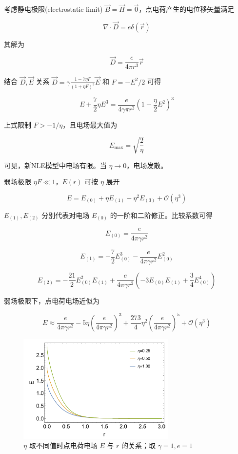 \documentclass[aps,prl,preprint,groupedaddress,showkeys]{revtex4-2}
\begin{document}
考虑静电极限(electrostatic limit) $\vec{B}=\vec{H}=\vec{0} $，点电荷产生的电位移矢量满足

$$
\nabla\cdot\vec{D} = e\delta(\vec{r})
$$

其解为

$$
\vec{D}
=\frac{e }{4\pi r^3 } \vec{r}
$$

结合 $\vec{D},\vec{E} $ 关系 $\vec{D}=\gamma\frac{1-7\eta F }{(1+\eta F)^3 }\vec{E} $ 和 $F=-E^2/2 $ 可得

$$
E+\frac{7 }{2 } \eta E^3
=\frac{e }{4\gamma \pi r^2 } \left(1-\frac{\eta  }{2 } E^2 \right)^3 
$$

上式限制 $F>-1/\eta$，且电场最大值为

$$
E_{\max}=\sqrt{\frac{2 }{\eta } }
$$

可见，新NLE模型中电场有限。当 $\eta\to 0 $，电场发散。

弱场极限 $\eta F\ll 1 $，$E(r) $ 可按 $\eta $ 展开

$$
E
=E_{(0)} + \eta E_{(1)} + \eta^2 E_{(3)} + \mathcal{O}\left(\eta^3 \right)
$$

$E_{(1)},E_{(2)} $ 分别代表对电场 $E_{(0)} $ 的一阶和二阶修正。比较系数可得
    
$$
E_{(0)}
=\frac{e }{4\pi\gamma r^2 }
$$

$$
E_{(1)} 
=-\frac{7 }{2 } E_{(0)}^3 - \frac{e }{4\pi \gamma r^2 } E_{(0)}^2
$$

$$
E_{(2)}
=-\frac{21 }{2 } E_{(0)}^2 E_{(1)} + \frac{e }{4\pi\gamma r^2 } \left(-3E_{(0)}E_{(1)} + \frac{3 }{4 } E_{(0)}^4 \right)
$$

弱场极限下，点电荷电场近似为

$$
E
\approx \frac{e }{4\pi\gamma r^2 } - 5\eta\left(\frac{e }{4\pi\gamma r^2 }  \right)^3 + \frac{273 }{4 } \eta^2\left(\frac{e }{4\pi\gamma r^2 }  \right)^5 + \mathcal{O}\left(\eta^3 \right)
$$

\begin{figure}
    \centering
    \includegraphics[width=0.7\textwidth]{fig/fig2.png}
    \caption{$\eta$ 取不同值时点电荷电场 $E$ 与 $r$ 的关系；取 $\gamma=1,e=1$}
\end{figure}   
\end{document}
